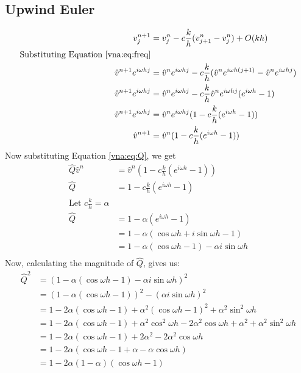 \subsection{Upwind Euler}
\begin{equation*}
\begin{aligned}
    v_j^{n+1}	&= v_j^n - c\frac{k}{h}(v_{j+1}^n - v_j^n) + O(kh)					\\
    \text{Substituting Equation \ref{vna:eq:freq}} 							\\
    \hat{v}^{n+1}e^{i\omega hj} &= \hat{v}^ne^{i\omega hj} - c\frac{k}{h} (\hat{v}^ne^{i\omega h(j+1)} - \hat{v}^ne^{i\omega hj})									    \\
    \hat{v}^{n+1}e^{i\omega hj} &= \hat{v}^ne^{i\omega hj} - c\frac{k}{h} \hat{v}^ne^{i\omega hj} (e^{i\omega h} - 1)												    \\
    \hat{v}^{n+1}e^{i\omega hj} &= \hat{v}^ne^{i\omega hj}(1 - c\frac{k}{h} (e^{i\omega h} - 1))	\\
    \hat{v}^{n+1} &= \hat{v}^n(1 - c\frac{k}{h} (e^{i\omega h} - 1))					\\
\end{aligned}
\end{equation*}
Now substituting Equation \ref{vna:eq:Q}, we get
\begin{equation*}
\begin{aligned}
    \hat{Q}\hat{v}^n &= \hat{v}^n(1 - c\frac{k}{h} (e^{i\omega h} - 1))	\\
    \hat{Q} &= 1 - c\frac{k}{h} (e^{i\omega h} - 1)			\\
    \text{Let } c\frac{k}{h} = \alpha 					\\
    \hat{Q} &= 1 - \alpha (e^{i\omega h} - 1)				\\
	    &= 1 - \alpha (\cos \omega h 	+ i \sin \omega h - 1)	\\
	    &= 1 - \alpha (\cos \omega h - 1) 	- \alpha i \sin \omega h\\
\end{aligned}
\end{equation*}
Now, calculating the magnitude of $\hat{Q}$, gives us:
\begin{equation*}
\begin{aligned}
    \hat{Q}^2 &= (1 - \alpha (\cos \omega h  - 1)	- \alpha i \sin \omega h )^2									\\
	      &= (1 - \alpha (\cos \omega h  - 1))^2 	- (\alpha i \sin \omega h )^2									\\
	      &= 1  - 2\alpha (\cos \omega h  - 1) 	+ \alpha^2(\cos \omega h  -1)^2	+ \alpha^2 \sin^2 \omega h					\\
	      &= 1  - 2\alpha (\cos \omega h  - 1) 	+ \alpha^2 \cos^2 \omega h - 2\alpha^2 \cos \omega h	+ \alpha^2 + \alpha^2 \sin^2 \omega h	\\
	      &= 1  - 2\alpha (\cos \omega h  - 1) 	+ 2\alpha^2 - 2\alpha^2 \cos \omega h								\\
	      &= 1  - 2\alpha (\cos \omega h  - 1 + \alpha - \alpha \cos \omega h)									\\
	      &= 1  - 2\alpha(1 - \alpha) (\cos \omega h  - 1)												\\
\end{aligned}
\end{equation*}
